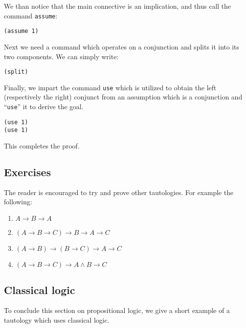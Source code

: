 \documentclass[12pt]{amsart}
\newcommand{\inquotes}[1]{``#1''}
\begin{document}
We than notice that the main connective is an implication, and thus
call the command \texttt{assume}:
\begin{verbatim}
(assume 1)
\end{verbatim}

Next we need a command which operates on a conjunction and splits it
into its two components. We can simply write:
\begin{verbatim}
(split)
\end{verbatim}

Finally, we impart the command \texttt{use} which is utilized to
obtain the left (respectively the right) conjunct from an assumption
which is a conjunction and \inquotes{\texttt{use}} it to derive the
goal.
\begin{verbatim}
(use 1)
(use 1)
\end{verbatim}
This completes the proof.


\subsection{Exercises}
The reader is encouraged to try and prove other tautologies.  For
example the following:
\begin{enumerate}
\item $A \to B \to A$
\item $(A \to B \to C) \to B \to A \to C$
\item $(A \to B) \to (B \to C) \to A \to C$
\item $(A \to B \to C) \to A \land B \to C$
\end{enumerate}


\subsection{Classical logic}
To conclude this section on propositional logic, we give a short
example of a tautology which uses classical logic.
\end{document}
